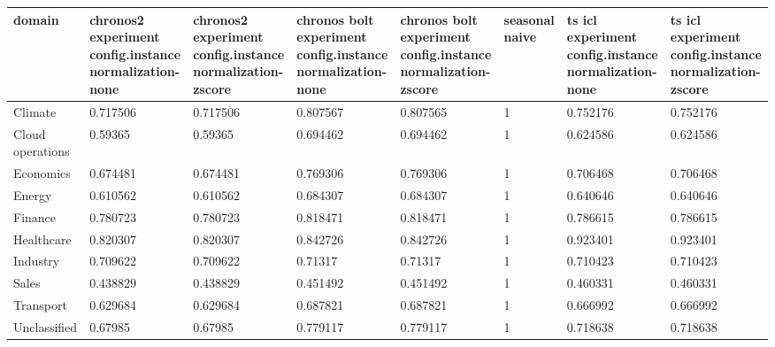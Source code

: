 \begin{tabular}{llllllll}
\toprule
domain & chronos2  experiment config.instance normalization-none & chronos2  experiment config.instance normalization-zscore & chronos bolt  experiment config.instance normalization-none & chronos bolt  experiment config.instance normalization-zscore & seasonal naive & ts icl  experiment config.instance normalization-none & ts icl  experiment config.instance normalization-zscore \\
\midrule
Climate & 0.717506 & 0.717506 & 0.807567 & 0.807565 & 1 & 0.752176 & 0.752176 \\
Cloud operations & 0.59365 & 0.59365 & 0.694462 & 0.694462 & 1 & 0.624586 & 0.624586 \\
Economics & 0.674481 & 0.674481 & 0.769306 & 0.769306 & 1 & 0.706468 & 0.706468 \\
Energy & 0.610562 & 0.610562 & 0.684307 & 0.684307 & 1 & 0.640646 & 0.640646 \\
Finance & 0.780723 & 0.780723 & 0.818471 & 0.818471 & 1 & 0.786615 & 0.786615 \\
Healthcare & 0.820307 & 0.820307 & 0.842726 & 0.842726 & 1 & 0.923401 & 0.923401 \\
Industry & 0.709622 & 0.709622 & 0.71317 & 0.71317 & 1 & 0.710423 & 0.710423 \\
Sales & 0.438829 & 0.438829 & 0.451492 & 0.451492 & 1 & 0.460331 & 0.460331 \\
Transport & 0.629684 & 0.629684 & 0.687821 & 0.687821 & 1 & 0.666992 & 0.666992 \\
Unclassified & 0.67985 & 0.67985 & 0.779117 & 0.779117 & 1 & 0.718638 & 0.718638 \\
\bottomrule
\end{tabular}
